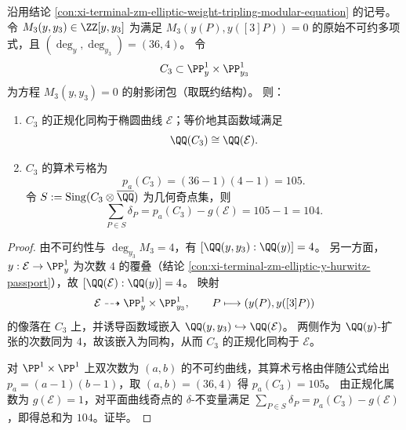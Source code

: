 
\begin{theorem}\label{thm:xi-terminal-zm-elliptic-weight-tripling-c3-normalization-delta}
沿用结论 \ref{con:xi-terminal-zm-elliptic-weight-tripling-modular-equation} 的记号。
令 \(M_3(y,y_3)\in\ZZ[y,y_3]\) 为满足 \(M_3(y(P),y([3]P))=0\) 的原始不可约多项式，且 \((\deg_y,\deg_{y_3})=(36,4)\)。
令
\[
C_3\subset \PP^1_y\times \PP^1_{y_3}
\]
为方程 \(M_3(y,y_3)=0\) 的射影闭包（取既约结构）。
则：
\begin{enumerate}
  \item \(C_3\) 的正规化同构于椭圆曲线 \(\mathcal E\)；等价地其函数域满足
  \[
  \QQ(C_3)\cong \QQ(\mathcal E).
  \]
  \item \(C_3\) 的算术亏格为
  \[
  p_a(C_3)=(36-1)(4-1)=105.
  \]
  令 \(S:=\mathrm{Sing}(C_3\otimes\overline{\QQ})\) 为几何奇点集，则
  \[
  \sum_{P\in S}\delta_P=p_a(C_3)-g(\mathcal E)=105-1=104.
  \]
\end{enumerate}
\end{theorem}
\begin{proof}
由不可约性与 \(\deg_{y_3}M_3=4\)，有
\(
[\QQ(y,y_3):\QQ(y)]=4
\)。
另一方面，\(y:\mathcal E\to\PP^1_y\) 为次数 \(4\) 的覆叠（结论 \ref{con:xi-terminal-zm-elliptic-y-hurwitz-passport}），故
\(
[\QQ(\mathcal E):\QQ(y)]=4
\)。
映射
\[
\mathcal E\dashrightarrow \PP^1_y\times\PP^1_{y_3},\qquad P\longmapsto (y(P),y([3]P))
\]
的像落在 \(C_3\) 上，并诱导函数域嵌入 \(\QQ(y,y_3)\hookrightarrow \QQ(\mathcal E)\)。
两侧作为 \(\QQ(y)\)-扩张的次数同为 \(4\)，故该嵌入为同构，从而 \(C_3\) 的正规化同构于 \(\mathcal E\)。
\par
对 \(\PP^1\times\PP^1\) 上双次数为 \((a,b)\) 的不可约曲线，其算术亏格由伴随公式给出 \(p_a=(a-1)(b-1)\)，取 \((a,b)=(36,4)\) 得 \(p_a(C_3)=105\)。
由正规化属数为 \(g(\mathcal E)=1\)，对平面曲线奇点的 \(\delta\)-不变量满足
\(
\sum_{P\in S}\delta_P=p_a(C_3)-g(\mathcal E)
\)，即得总和为 \(104\)。证毕。
\end{proof}

